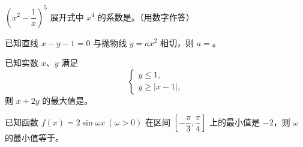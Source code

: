 \begin{question}
$\left(x^2-\dfrac1x\right)^5$ 展开式中 $x^4$ 的系数是\gkblank{}。（用数字作答）

\end{question}
\begin{question}
已知直线 $x-y-1=0$ 与抛物线 $y=ax^2$ 相切，则 $a=$\gkblank{}。

\end{question}
\begin{question}
已知实数 $x\text{、}y$ 满足
\nopagebreak[4]
\[
\begin{cases}
y\le 1,\\
y\ge |x-1|,
\end{cases}
\]
则 $x+2y$ 的最大值是\gkblank{}。

\end{question}
\begin{question}
已知函数 $f(x)=2\sin\omega x\ (\omega>0)$ 在区间 $\left[-\dfrac\pi3,\dfrac\pi4\right]$ 上的最小值是 $-2$，则 $\omega$ 的最小值等于\gkblank{}。

\end{question}

